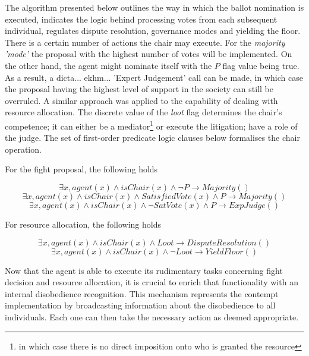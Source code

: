 The algorithm presented below outlines the way in which the ballot nomination is executed, indicates the logic behind processing votes from each subsequent individual, regulates dispute resolution, governance modes and yielding the floor. There is a certain number of actions the chair may execute. For the \textit{majority 'mode'} the proposal with the highest number of votes will be implemented. On the other hand, the agent might nominate itself with the $P$ flag value being true. As a result, a dicta... ekhm... 'Expert Judgement' call can be made,  in which case the proposal having the highest level of support in the society can still be overruled. A similar approach was applied to the capability of dealing with resource allocation. The discrete value of the \textit{loot} flag determines the chair's competence; it can either be a mediator\footnote{in which case there is no direct imposition onto who is granted the resource} or execute the litigation; have a role of the judge. The set of first-order predicate logic clauses below formalises the chair operation.

For the fight proposal, the following holds

\begin{equation}
    \exists x, agent(x) \land isChair(x) \land \neg P \rightarrow Majority()
\end{equation}
\begin{equation}
    \exists x, agent(x) \land isChair(x) \land SatisfiedVote(x) \land P \rightarrow Majority()
\end{equation}
\begin{equation}
    \exists x, agent(x) \land isChair(x) \land \neg SatVote(x) \land P \rightarrow ExpJudge()
\end{equation}

For resource allocation, the following holds

\begin{equation}
    \exists x, agent(x) \land isChair(x) \land Loot \rightarrow DisputeResolution()
\end{equation}
\begin{equation}
    \exists x, agent(x) \land isChair(x) \land \neg Loot \rightarrow YieldFloor()
\end{equation}

Now that the agent is able to execute its rudimentary tasks concerning fight decision and resource allocation, it is crucial to enrich that functionality with an internal disobedience recognition. This mechanism represents the contempt implementation by broadcasting information about the disobedience to all individuals. Each one can then take the necessary action as deemed appropriate. 

